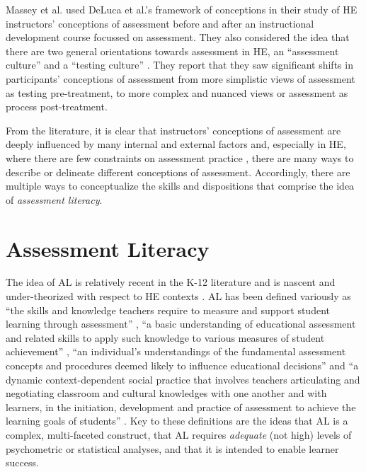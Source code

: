 \documentclass[
]{book}
\begin{document}
Massey et al. \citep{masseyAssessmentLiteracyCollege2020} used DeLuca et al.'s \citeyearpar{delucaEstablishingFoundationValid2013} framework of conceptions in their study of HE instructors' conceptions of assessment before and after an instructional development course focussed on assessment. They also considered the idea that there are two general orientations towards assessment in HE, an ``assessment culture'' and a ``testing culture'' \citep[as cited in \citet{masseyAssessmentLiteracyCollege2020}]{birenbaumAssessment2000Pluralistic1996, birenbaumNewInsightsLearning2003}. They report that they saw significant shifts in participants' conceptions of assessment from more simplistic views of assessment as testing pre-treatment, to more complex and nuanced views or assessment as process post-treatment.

From the literature, it is clear that instructors' conceptions of assessment are deeply influenced by many internal and external factors and, especially in HE, where there are few constraints on assessment practice \citep{lipnevichWhatGradesMean2020}, there are many ways to describe or delineate different conceptions of assessment. Accordingly, there are multiple ways to conceptualize the skills and dispositions that comprise the idea of \emph{assessment literacy}.

\hypertarget{assessment-literacy}{%
\section{Assessment Literacy}\label{assessment-literacy}}

The idea of AL is relatively recent in the K-12 literature and is nascent and under-theorized with respect to HE contexts \citep{medlandExaminingAssessmentLiteracy2015}. AL has been defined variously as ``the skills and knowledge teachers require to measure and support student learning through assessment'' \citep{delucaApproachesClassroomAssessment2016}, ``a basic understanding of educational assessment and related skills to apply such knowledge to various measures of student achievement'' \citep{xuTeacherAssessmentLiteracy2016}, ``an individual's understandings of the fundamental assessment concepts and procedures deemed likely to influence educational decisions'' \citep{pophamAssessmentLiteracyOverlooked2011} and ``a dynamic context-dependent social practice that involves teachers articulating and negotiating classroom and cultural knowledges with one another and with learners, in the initiation, development and practice of assessment to achieve the learning goals of students'' \citep{willisConceptualisingTeachersAssessment2013}. Key to these definitions are the ideas that AL is a complex, multi-faceted construct, that AL requires \emph{adequate} (not high) levels of psychometric or statistical analyses, and that it is intended to enable learner success.
\end{document}
